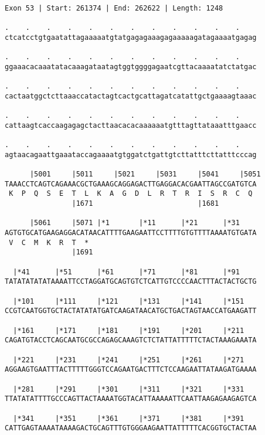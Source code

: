 \documentclass{article}
\begin{document}
\newpage
\begin{Verbatim}[fontfamily=courier]
Exon 53 | Start: 261374 | End: 262622 | Length: 1248

.    .    .    .    .    .    .    .    .    .    .    .    
ctcatcctgtgaatattagaaaaatgtatgagagaaagagaaaaagatagaaaatgagag

.    .    .    .    .    .    .    .    .    .    .    .    
ggaaacacaaatatacaaagataatagtggtggggagaatcgttacaaaatatctatgac

.    .    .    .    .    .    .    .    .    .    .    .    
cactaatggctcttaaaccatactagtcactgcattagatcatattgctgaaaagtaaac

.    .    .    .    .    .    .    .    .    .    .    .    
cattaagtcaccaagagagctacttaacacacaaaaaatgtttagttataaatttgaacc

.    .    .    .    .    .    .    .    .    .    .    .    
agtaacagaattgaaataccagaaaatgtggatctgattgtcttatttcttatttcccag

      |5001     |5011     |5021     |5031     |5041     |5051
TAAACCTCAGTCAGAAACGCTGAAAGCAGGAGACTTGAGGACACGAATTAGCCGATGTCA
 K  P  Q  S  E  T  L  K  A  G  D  L  R  T  R  I  S  R  C  Q 
                |1671                         |1681         

      |5061     |5071 |*1       |*11      |*21      |*31    
AGTGTGCATGAAGAGGACATAACATTTTGAAGAATTCCTTTTGTGTTTTAAAATGTGATA
 V  C  M  K  R  T  *   
                |1691                                       

  |*41      |*51      |*61      |*71      |*81      |*91    
TATATATATATAAAATTCCTAGGATGCAGTGTCTCATTGTCCCCAACTTTACTACTGCTG

  |*101     |*111     |*121     |*131     |*141     |*151   
CCGTCAATGGTGCTACTATATATGATCAAGATAACATGCTGACTAGTAACCATGAAGATT

  |*161     |*171     |*181     |*191     |*201     |*211   
CAGATGTACCTCAGCAATGCGCCAGAGCAAAGTCTCTATTATTTTTCTACTAAAGAAATA

  |*221     |*231     |*241     |*251     |*261     |*271   
AGGAAGTGAATTTACTTTTTGGGTCCAGAATGACTTTCTCCAAGAATTATAAGATGAAAA

  |*281     |*291     |*301     |*311     |*321     |*331   
TTATATATTTTGCCCAGTTACTAAAATGGTACATTAAAAATTCAATTAAGAGAAGAGTCA

  |*341     |*351     |*361     |*371     |*381     |*391   
CATTGAGTAAAATAAAAGACTGCAGTTTGTGGGAAGAATTATTTTTCACGGTGCTACTAA

\end{Verbatim}
\newpage
\end{document}
